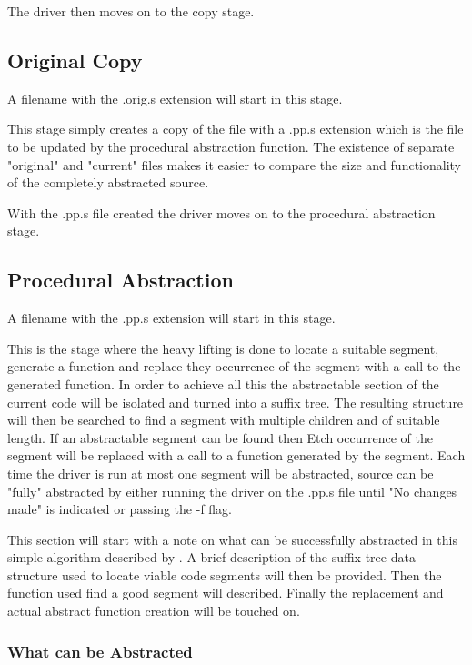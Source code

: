 \documentclass[9pt,nocopyrightspace]{sigplanconf}
\begin{document}
The driver then moves on to the copy stage.

\subsection{Original Copy}

A filename with the .orig.s extension will start in this stage.

This stage simply creates a copy of the file with a .pp.s extension which is the file to be updated by the procedural abstraction function.
The existence of separate "original" and "current" files makes it easier to compare the size and functionality of the completely abstracted source.

With the .pp.s file created the driver moves on to the procedural abstraction stage.

\subsection{Procedural Abstraction}

A filename with the .pp.s extension will start in this stage.

This is the stage where the heavy lifting is done to locate a suitable segment, generate a function and replace they occurrence of the segment with a call to the generated function.
In order to achieve all this the abstractable section of the current code will be isolated and turned into a suffix tree.
The resulting structure will then be searched to find a segment with multiple children and of suitable length.
If an abstractable segment can be found then Etch occurrence of the segment will be replaced with a call to a function generated by the segment.
Each time the driver is run at most one segment will be abstracted, source can be "fully" abstracted by either running the driver on the .pp.s file until "No changes made" is indicated or passing the -f flag.

This section will start with a note on what can be successfully abstracted in this simple algorithm described by \cite{theory01}.
A brief description of the suffix tree data structure used to locate viable code segments will then be provided.
Then the function used find a good segment will described.
Finally the replacement and actual abstract function creation will be touched on.

\subsubsection{What can be Abstracted}
\end{document}
